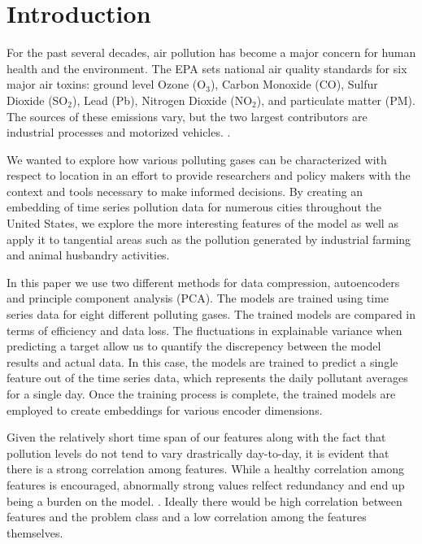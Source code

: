\documentclass{article}
\begin{document}
\vspace{0.25cm}

\section{Introduction}

\par For the past several decades, air pollution has become a major concern for human health and the environment. The EPA sets national air quality standards for  six major air toxins: ground level Ozone (O$_3$), Carbon Monoxide (CO), Sulfur Dioxide (SO$_2$), Lead (Pb), Nitrogen Dioxide (NO$_2$), and particulate matter (PM). The sources of these emissions vary, but the two largest contributors are industrial processes and motorized vehicles. \parencite{NAAQS09}.
\par We wanted to explore how various polluting gases can be characterized with respect to location in an effort to provide researchers and policy makers with the context and tools necessary to make informed decisions. By creating an embedding of time series pollution data for numerous cities throughout the United States, we explore the more interesting features of the model as well as apply it to tangential areas such as the pollution generated by industrial farming and animal husbandry activities.
\par In this paper we use two different methods for data compression, autoencoders and principle component analysis (PCA). The models are trained using time series data for eight different polluting gases. The trained models are compared in terms of efficiency and data loss. The fluctuations in explainable variance when predicting a target allow us to quantify the discrepency between the model results and actual data. In this case, the models are trained to predict a single feature out of the time series data, which represents the daily pollutant averages for a single day. Once the training process is complete, the trained models are employed to create embeddings for various encoder dimensions. 
\par Given the relatively short time span of our features along with the fact that pollution levels do not tend to vary drastrically day-to-day, it is evident that there is a strong correlation among features. While a healthy correlation among features is encouraged, abnormally strong values
relfect redundancy and end up being a burden on the model. \parencite{featureredundancy}. Ideally there would be high correlation between features and the problem class and a low correlation among the features themselves.
\end{document}
